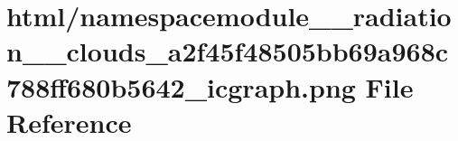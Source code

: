 \hypertarget{namespacemodule____radiation____clouds__a2f45f48505bb69a968c788ff680b5642__icgraph_8png}{}\section{html/namespacemodule\+\_\+\+\_\+radiation\+\_\+\+\_\+clouds\+\_\+a2f45f48505bb69a968c788ff680b5642\+\_\+icgraph.png File Reference}
\label{namespacemodule____radiation____clouds__a2f45f48505bb69a968c788ff680b5642__icgraph_8png}
